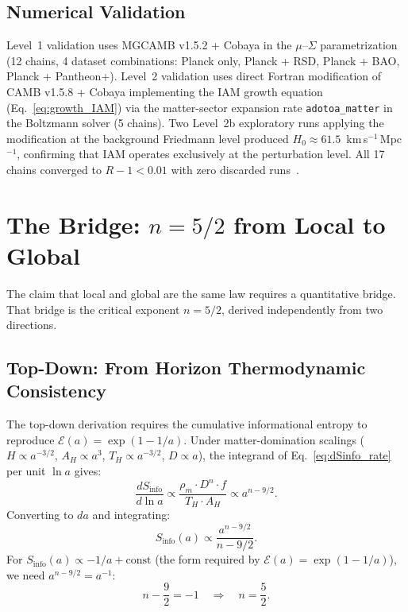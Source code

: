 \documentclass[12pt,a4paper]{article}
\begin{document}
\subsection{Numerical Validation}

Level~1 validation uses MGCAMB v1.5.2 + Cobaya in the $\mu$--$\Sigma$
parametrization (12 chains, 4 dataset combinations: Planck only,
Planck + RSD, Planck + BAO, Planck + Pantheon+). Level~2 validation
uses direct Fortran modification of CAMB v1.5.8 + Cobaya implementing
the IAM growth equation (Eq.~\eqref{eq:growth_IAM}) via the matter-sector
expansion rate \texttt{adotoa\_matter} in the Boltzmann solver (5 chains).
Two Level~2b exploratory runs applying the modification at the background
Friedmann level produced $H_0 \approx 61.5$~km\,s$^{-1}$\,Mpc$^{-1}$,
confirming that IAM operates exclusively at the perturbation level.
All 17 chains converged to $R-1 < 0.01$ with zero discarded
runs~\citep{IAM_archive}.

\section{The Bridge: $n = 5/2$ from Local to Global}
\label{sec:bridge}

The claim that local and global are the same law requires a
quantitative bridge. That bridge is the critical exponent $n = 5/2$,
derived independently from two directions.

\subsection{Top-Down: From Horizon Thermodynamic Consistency}

The top-down derivation requires the cumulative informational entropy
to reproduce $\mathcal{E}(a) = \exp(1-1/a)$. Under matter-domination
scalings ($H \propto a^{-3/2}$, $A_H \propto a^3$, $T_H \propto
a^{-3/2}$, $D \propto a$), the integrand of
Eq.~\eqref{eq:dSinfo_rate} per unit $\ln a$ gives:
\begin{equation}
\frac{dS_\mathrm{info}}{d\ln a} \propto
\frac{\rho_m \cdot D^n \cdot f}{T_H \cdot A_H}
\propto a^{n - 9/2}.
\label{eq:topdown_scaling}
\end{equation}
Converting to $da$ and integrating:
\begin{equation}
S_\mathrm{info}(a) \propto \frac{a^{n-9/2}}{n - 9/2}.
\label{eq:Sinfo_integral}
\end{equation}
For $S_\mathrm{info}(a) \propto -1/a + \text{const}$ (the form
required by $\mathcal{E}(a) = \exp(1-1/a)$), we need
$a^{n-9/2} = a^{-1}$:
\begin{equation}
n - \frac{9}{2} = -1
\quad\Longrightarrow\quad \boxed{n = \frac{5}{2}.}
\label{eq:n_topdown}
\end{equation}
\end{document}
